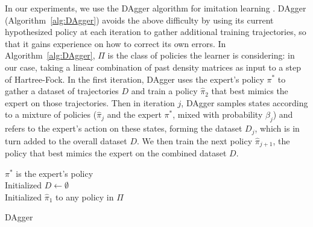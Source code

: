 \documentclass[twoside,11pt]{article}
\begin{document}
In our experiments, we use the DAgger algorithm for imitation learning \citep{DAgger}.  DAgger (Algorithm~\ref{alg:DAgger}) avoids the above difficulty by using its current hypothesized policy at each iteration to gather additional training trajectories, so that it gains experience on how to correct its own errors.
%
%
In Algorithm~\ref{alg:DAgger}, $\Pi$ is the class of policies the learner is considering: in our case, taking a linear combination of past density matrices as input to a step of Hartree-Fock. In the first iteration, DAgger uses the expert's policy $\pi^*$ to gather a dataset of trajectories $D$ and train a policy $\hat{\pi}_2$ that best mimics the expert on those trajectories. 
Then in iteration $j$, DAgger samples states according to a mixture of policies ($\hat{\pi}_j$ and the expert $\pi^*$, mixed with probability $\beta_j$) and refers to the expert's action on these states, forming the dataset $D_j$, which is in turn added to the overall dataset $D$. We then train the next policy $\hat{\pi}_{j+1}$, the policy that best mimics the expert on the combined dataset $D$.  


\begin{algorithm}[htb]
 $\pi^*$  is the expert’s policy \\
 Initialized $D \leftarrow \emptyset$ \\
 Initialized $\hat{\pi}_1$ to any policy in $\Pi$ \\
 \caption{DAgger}
 \label{alg:DAgger}
\end{algorithm}
\end{document}
